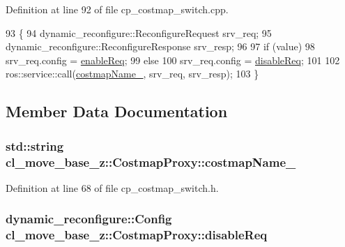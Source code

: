 Definition at line 92 of file cp\+\_\+costmap\+\_\+switch.\+cpp.


\begin{DoxyCode}
93 \{
94     dynamic\_reconfigure::ReconfigureRequest srv\_req;
95     dynamic\_reconfigure::ReconfigureResponse srv\_resp;
96 
97     \textcolor{keywordflow}{if} (value)
98         srv\_req.config = \hyperlink{classcl__move__base__z_1_1CostmapProxy_aff2defa5d265d3e8efda4849eedd3500}{enableReq};
99     \textcolor{keywordflow}{else}
100         srv\_req.config = \hyperlink{classcl__move__base__z_1_1CostmapProxy_a798847a9ee787134e26326edc574020f}{disableReq};
101 
102     ros::service::call(\hyperlink{classcl__move__base__z_1_1CostmapProxy_adb1ed877b9ec2ff7f9f73775dd4ead7b}{costmapName\_}, srv\_req, srv\_resp);
103 \}
\end{DoxyCode}


\subsection{Member Data Documentation}
\subsubsection[{\texorpdfstring{costmap\+Name\+\_\+}{costmapName_}}]{\setlength{\rightskip}{0pt plus 5cm}std\+::string cl\+\_\+move\+\_\+base\+\_\+z\+::\+Costmap\+Proxy\+::costmap\+Name\+\_\+\hspace{0.3cm}{\ttfamily [private]}}\hypertarget{classcl__move__base__z_1_1CostmapProxy_adb1ed877b9ec2ff7f9f73775dd4ead7b}{}\label{classcl__move__base__z_1_1CostmapProxy_adb1ed877b9ec2ff7f9f73775dd4ead7b}


Definition at line 68 of file cp\+\_\+costmap\+\_\+switch.\+h.

\subsubsection[{\texorpdfstring{disable\+Req}{disableReq}}]{\setlength{\rightskip}{0pt plus 5cm}dynamic\+\_\+reconfigure\+::\+Config cl\+\_\+move\+\_\+base\+\_\+z\+::\+Costmap\+Proxy\+::disable\+Req\hspace{0.3cm}{\ttfamily [private]}}\hypertarget{classcl__move__base__z_1_1CostmapProxy_a798847a9ee787134e26326edc574020f}{}\label{classcl__move__base__z_1_1CostmapProxy_a798847a9ee787134e26326edc574020f}


